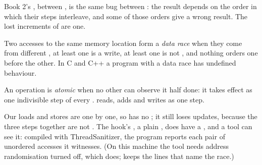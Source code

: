 \begin{remark}\label{def:b2:threads-and-synchronisation:race}
Book 2's , between , is the same bug between : the result depends on the order in which
their steps interleave, and some of those orders give a wrong result. The lost increments of  are one.
\end{remark}

\begin{definition}\label{def:b2:threads-and-synchronisation:data-race}
Two accesses to the same memory location form a \emph{data race} when they come from different
, at least one is a write, at least one is not , and nothing orders one before the other. In C and C++ a
program with a data race has undefined behaviour.
\end{definition}

\begin{definition}\label{def:b2:threads-and-synchronisation:atomic}
An operation is \emph{atomic} when no other  can observe it half done: it takes effect
as one indivisible step of every .  reads, adds and writes as one step.
\end{definition}

Our loads and stores are  one by one, so  has no ; it still loses updates, because the
three steps together are not . The hook's , a plain , does have a , and a
tool can see it: compiled with ThreadSanitizer, the program reports each pair of unordered accesses it witnesses.
(On this machine the tool needs address randomisation turned off, which  does;  keeps
the lines that name the race.)


